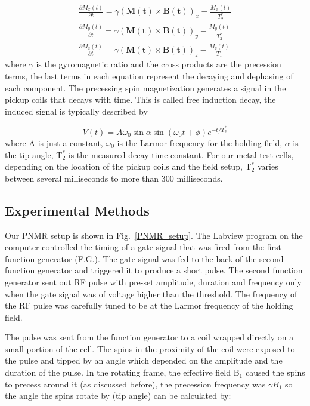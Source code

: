 \begin{subequations}
	\begin{gather}
	\frac{\partial M_{x}(t)}{\partial t}=\gamma\left(\boldsymbol{M(t)}\times \boldsymbol{B(t)}\right)_{x}-\frac{M_{x}(t)}{T_{2}^{*}}\\
	\frac{\partial M_{y}(t)}{\partial t}=\gamma\left(\boldsymbol{M(t)}\times \boldsymbol{B(t)}\right)_{y}-\frac{M_{y}(t)}{T_{2}^{*}}\\
	\frac{\partial M_{z}(t)}{\partial t}=\gamma\left(\boldsymbol{M(t)}\times \boldsymbol{B(t)}\right)_{z}-\frac{M_{z}(t)}{T_{1}}
	\end{gather}
\end{subequations}
where $\gamma$ is the gyromagnetic ratio and the cross products are the precession terms, the last terms in each equation represent the decaying and dephasing of each component. The precessing spin magnetization generates a signal in the pickup coils that decays with time. This is called free induction decay, the induced signal is typically described by

\begin{equation}
V(t)=A\omega_{0}\sin{\alpha}\sin{\left(\omega_{0}t+\phi\right)}e^{-t/T_{2}^{*}}
\end{equation}
where A is just a constant, $\omega_{0}$ is the Larmor frequency for the holding field, $\alpha$ is the tip angle, T$_{2}^{*}$ is the measured decay time constant. For our metal test cells, depending on the location of the pickup coils and the field setup, T$_{2}^{*}$ varies between several milliseconds to more than 300 milliseconds.

\subsection{Experimental Methods}

Our PNMR setup is shown in Fig.~\ref{PNMR_setup}. The Labview program on the computer controlled the timing of a gate signal that was fired from the first function generator (F.G.). The gate signal was fed to the back of the second function generator and triggered it to produce a short pulse. The second function generator sent out RF pulse with pre-set amplitude, duration and frequency only when the gate signal was of voltage higher than the threshold. The frequency of the RF pulse was carefully tuned to be at the Larmor frequency of the holding field. 

The pulse was sent from the function generator to a coil wrapped directly on a small portion of the cell. The spins in the proximity of the coil were exposed to the pulse and tipped by an angle which depended on the amplitude and the duration of the pulse. In the rotating frame, the effective field B$_{1}$ caused the spins to precess around it (as discussed before), the precession frequency was $\gamma B_{1}$ so the angle the spins rotate by (tip angle) can be calculated by:  

